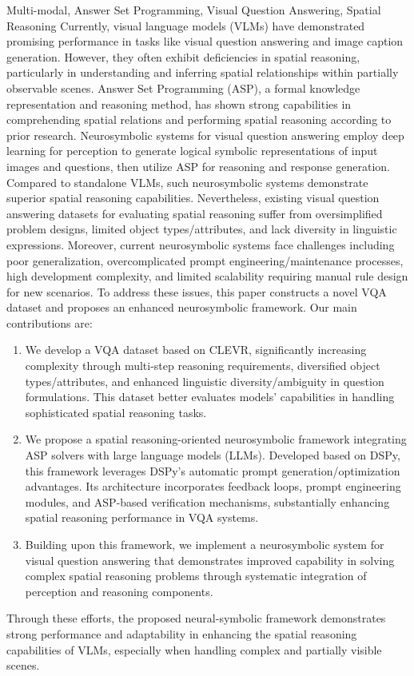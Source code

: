 \begin{englishabstract}{Multi-modal, Answer Set Programming, Visual Question Answering, Spatial Reasoning}
Currently, visual language models (VLMs) have demonstrated promising performance in tasks like visual question answering and image caption generation. However, they often exhibit deficiencies in spatial reasoning, particularly in understanding and inferring spatial relationships within partially observable scenes.
Answer Set Programming (ASP), a formal knowledge representation and reasoning method, has shown strong capabilities in comprehending spatial relations and performing spatial reasoning according to prior research. Neurosymbolic systems for visual question answering employ deep learning for perception to generate logical symbolic representations of input images and questions, then utilize ASP for reasoning and response generation. Compared to standalone VLMs, such neurosymbolic systems demonstrate superior spatial reasoning capabilities. Nevertheless, existing visual question answering datasets for evaluating spatial reasoning suffer from oversimplified problem designs, limited object types/attributes, and lack diversity in linguistic expressions.
Moreover, current neurosymbolic systems face challenges including poor generalization, overcomplicated prompt engineering/maintenance processes, high development complexity, and limited scalability requiring manual rule design for new scenarios. To address these issues, this paper constructs a novel VQA dataset and proposes an enhanced neurosymbolic framework. Our main contributions are:
\begin{enumerate}[itemsep=0pt]
    \item We develop a VQA dataset based on CLEVR, significantly increasing complexity through multi-step reasoning requirements, diversified object types/attributes, and enhanced linguistic diversity/ambiguity in question formulations. This dataset better evaluates models' capabilities in handling sophisticated spatial reasoning tasks.
    \item We propose a spatial reasoning-oriented neurosymbolic framework integrating ASP solvers with large language models (LLMs). Developed based on DSPy, this framework leverages DSPy's automatic prompt generation/optimization advantages. Its architecture incorporates feedback loops, prompt engineering modules, and ASP-based verification mechanisms, substantially enhancing spatial reasoning performance in VQA systems.
    \item Building upon this framework, we implement a neurosymbolic system for visual question answering that demonstrates improved capability in solving complex spatial reasoning problems through systematic integration of perception and reasoning components.
\end{enumerate}

Through these efforts, the proposed neural-symbolic framework demonstrates strong performance and adaptability in enhancing the spatial reasoning capabilities of VLMs, especially when handling complex and partially visible scenes.
\end{englishabstract}

\tableofcontents
\listofothers
